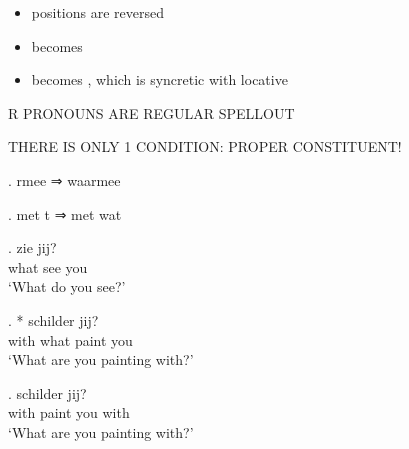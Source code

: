 \documentclass[xcolor=dvipsnames,10pt]{beamer}
\begin{document}
\begin{frame}


\vspace{1em}

\pause

\begin{itemize}
	\item positions are reversed \pause
	\item {} becomes  \pause
	\item {} becomes , which is syncretic with locative
\end{itemize}

\vspace{1em}

R PRONOUNS ARE REGULAR SPELLOUT

THERE IS ONLY 1 CONDITION: PROPER CONSTITUENT!

\end{frame}




\begin{frame}

\ex. rmee ⇒ waarmee

\ex. met t ⇒ met wat

\pause
\vspace{1em}

\exg.  zie jij?\\
 what see you\\
 `What do you see?'\label{ex:wat}

\exg. *  schilder jij?\\
 with what paint you\\
 `What are you painting with?'\label{ex:metwat}

\exg.   schilder jij?\\
  with paint you with\\
 `What are you painting with?'\label{ex:waar-mee}

\end{frame}
\end{document}
